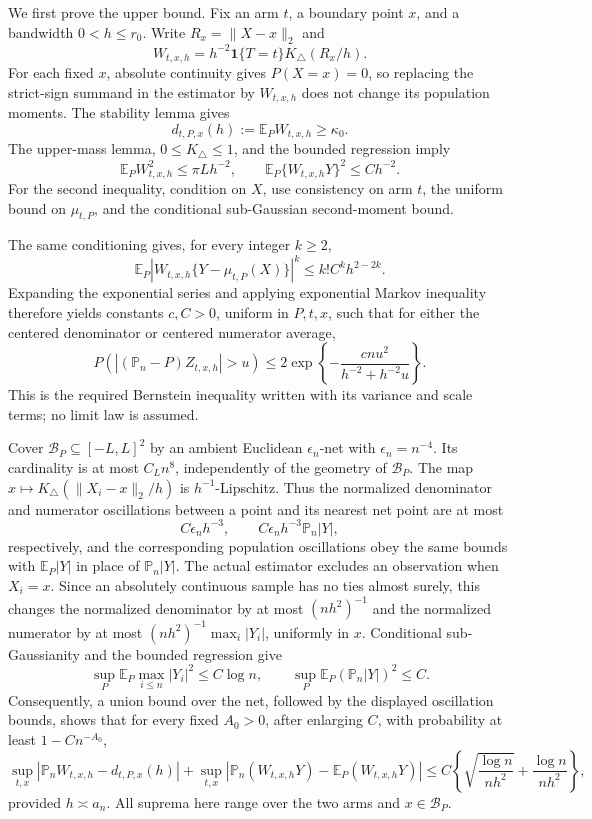 We first prove the upper bound.  Fix an arm \(t\), a boundary point \(x\), and a bandwidth \(0<h\leq r_0\).  Write \(R_x=\lVert X-x\rVert_2\) and
\[
 W_{t,x,h}=h^{-2}\mathbf1\{T=t\}K_\triangle(R_x/h).
\]
For each fixed \(x\), absolute continuity gives \(P(X=x)=0\), so replacing the strict-sign summand in the estimator by \(W_{t,x,h}\) does not change its population moments.  The stability lemma gives
\[
 d_{t,P,x}(h):=\mathbb E_PW_{t,x,h}\geq\kappa_0.
\]
The upper-mass lemma, \(0\leq K_\triangle\leq1\), and the bounded regression imply
\[
 \mathbb E_PW_{t,x,h}^2\leq \pi Lh^{-2},
 \qquad
 \mathbb E_P\{W_{t,x,h}Y\}^2\leq Ch^{-2}.
\]
For the second inequality, condition on \(X\), use consistency on arm \(t\), the uniform bound on \(\mu_{t,P}\), and the conditional sub-Gaussian second-moment bound.

The same conditioning gives, for every integer \(k\geq2\),
\[
 \mathbb E_P|W_{t,x,h}\{Y-\mu_{t,P}(X)\}|^k
 \leq k!C^k h^{2-2k}.
\]
Expanding the exponential series and applying exponential Markov inequality therefore yields constants \(c,C>0\), uniform in \(P,t,x\), such that for either the centered denominator or centered numerator average,
\[
 P\!\left(\left|(\mathbb P_n-P)Z_{t,x,h}\right|>u\right)
 \leq2\exp\!\left\{-\frac{cnu^2}{h^{-2}+h^{-2}u}\right\}.
\]
This is the required Bernstein inequality written with its variance and scale terms; no limit law is assumed.

Cover \(\mathcal B_P\subseteq[-L,L]^2\) by an ambient Euclidean \(\epsilon_n\)-net with \(\epsilon_n=n^{-4}\).  Its cardinality is at most \(C_Ln^8\), independently of the geometry of \(\mathcal B_P\).  The map \(x\mapsto K_\triangle(\lVert X_i-x\rVert_2/h)\) is \(h^{-1}\)-Lipschitz.  Thus the normalized denominator and numerator oscillations between a point and its nearest net point are at most
\[
 C\epsilon_nh^{-3},
 \qquad
 C\epsilon_nh^{-3}\mathbb P_n|Y|,
\]
respectively, and the corresponding population oscillations obey the same bounds with \(\mathbb E_P|Y|\) in place of \(\mathbb P_n|Y|\).  The actual estimator excludes an observation when \(X_i=x\).  Since an absolutely continuous sample has no ties almost surely, this changes the normalized denominator by at most \((nh^2)^{-1}\) and the normalized numerator by at most \((nh^2)^{-1}\max_i|Y_i|\), uniformly in \(x\).  Conditional sub-Gaussianity and the bounded regression give
\[
 \sup_P\mathbb E_P\max_{i\leq n}|Y_i|^2\leq C\log n,
 \qquad
 \sup_P\mathbb E_P(\mathbb P_n|Y|)^2\leq C.
\]
Consequently, a union bound over the net, followed by the displayed oscillation bounds, shows that for every fixed \(A_0>0\), after enlarging \(C\), with probability at least \(1-Cn^{-A_0}\),
\[
 \sup_{t,x}\left|\mathbb P_nW_{t,x,h}-d_{t,P,x}(h)\right|
 +\sup_{t,x}\left|\mathbb P_n(W_{t,x,h}Y)-\mathbb E_P(W_{t,x,h}Y)\right|
 \leq C\left\{\sqrt{\frac{\log n}{nh^2}}+\frac{\log n}{nh^2}\right\},
\]
provided \(h\asymp a_n\).  All suprema here range over the two arms and \(x\in\mathcal B_P\).

